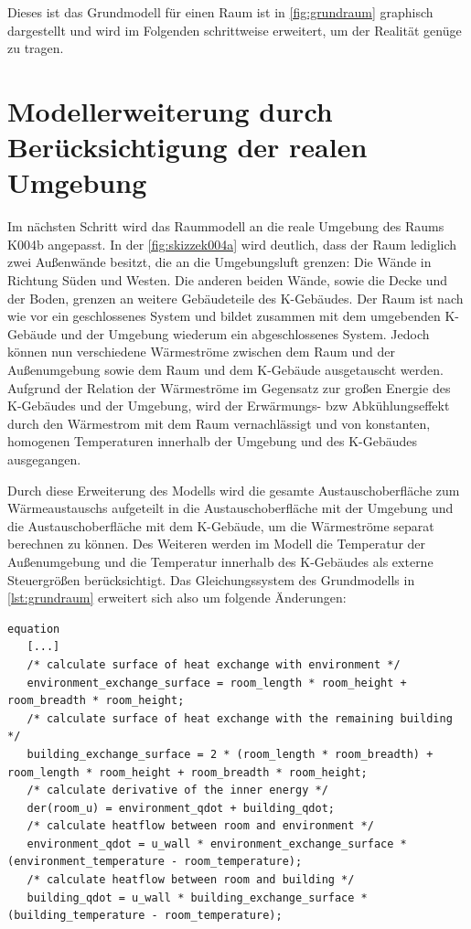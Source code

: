 Dieses ist das Grundmodell für einen Raum ist in \ref{fig:grundraum} graphisch dargestellt und wird im Folgenden schrittweise erweitert, um der Realität genüge zu tragen.

\section{Modellerweiterung durch Berücksichtigung der realen Umgebung}

Im nächsten Schritt wird das Raummodell an die reale Umgebung des Raums K004b angepasst. In der \ref{fig:skizzek004a} wird deutlich, dass der Raum lediglich zwei Außenwände besitzt, die an die Umgebungsluft grenzen: Die Wände in Richtung Süden und Westen. Die anderen beiden Wände, sowie die Decke und der Boden, grenzen an weitere Gebäudeteile des K-Gebäudes. Der Raum ist nach wie vor ein geschlossenes System und bildet zusammen mit dem umgebenden K-Gebäude und der Umgebung wiederum ein abgeschlossenes System. Jedoch können nun verschiedene Wärmeströme zwischen dem Raum und der Außenumgebung sowie dem Raum und dem K-Gebäude ausgetauscht werden. Aufgrund der Relation der Wärmeströme im Gegensatz zur großen Energie des K-Gebäudes und der Umgebung, wird der Erwärmungs- bzw Abkühlungseffekt durch den Wärmestrom mit dem Raum vernachlässigt und von konstanten, homogenen Temperaturen innerhalb der Umgebung und des K-Gebäudes ausgegangen.

Durch diese Erweiterung des Modells wird die gesamte Austauschoberfläche zum Wärmeaustauschs aufgeteilt in die Austauschoberfläche mit der Umgebung und die Austauschoberfläche mit dem K-Gebäude, um die Wärmeströme separat berechnen zu können. Des Weiteren werden im Modell die Temperatur der Außenumgebung und die Temperatur innerhalb des K-Gebäudes als externe Steuergrößen berücksichtigt. Das Gleichungssystem des Grundmodells in \ref{lst:grundraum} erweitert sich also um folgende Änderungen:

\begin{lstlisting}[language=Modelica,label=lst:raumeins]
equation
   [...]
   /* calculate surface of heat exchange with environment */
   environment_exchange_surface = room_length * room_height + room_breadth * room_height;
   /* calculate surface of heat exchange with the remaining building */
   building_exchange_surface = 2 * (room_length * room_breadth) + room_length * room_height + room_breadth * room_height;
   /* calculate derivative of the inner energy */
   der(room_u) = environment_qdot + building_qdot;
   /* calculate heatflow between room and environment */
   environment_qdot = u_wall * environment_exchange_surface * (environment_temperature - room_temperature);
   /* calculate heatflow between room and building */
   building_qdot = u_wall * building_exchange_surface * (building_temperature - room_temperature);
\end{lstlisting}

